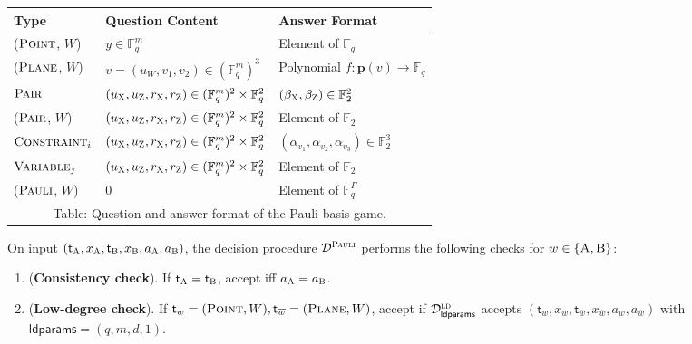 \documentclass[11pt]{article}
\theoremstyle{definition}
\newcommand{\F}{\ensuremath{\mathbb{F}}}
\newcommand{\ld}{\textsc{ld}}
\newcommand{\pl}{\mathbf{p}}
\newcommand{\decider}{\mathcal{D}}
\newcommand{\gamestyle}[1]{\ensuremath{\textsc{#1}}\xspace}
\newcommand{\pauli}{\gamestyle{Pauli}}
\newcommand{\labelstyle}[1]{\ensuremath{\textsc{#1}}\xspace}
\newcommand{\xpt}{\labelstyle{X}}
\newcommand{\zpt}{\labelstyle{Z}}
\newcommand{\tvarstyle}[1]{\mathsf{#1}}
\newcommand{\tvar}{\ensuremath{\tvarstyle{t}}}
\newcommand{\alice}{\labelstyle{A}}
\newcommand{\bob}{\labelstyle{B}}
\newcommand{\typestyle}[1]{\ensuremath{\textsc{#1}}\xspace}
\newcommand{\Plane}{\typestyle{Plane}}
\newcommand{\Point}{\typestyle{Point}}
\newcommand{\Pair}{\typestyle{Pair}}
\newcommand{\Constraint}{\typestyle{Constraint}}
\newcommand{\Variable}{\typestyle{Variable}}
\newcommand{\Pauli}{\typestyle{Pauli}}
\newcommand{\AB}{\{\alice, \bob\}}
\newcommand{\ldparams}{\mathsf{ldparams}}
\newenvironment{gamespec}{
  \begin{mdframed}[style=figstyle]}{
  \end{mdframed}}
\newcommand{\hnote}[1]{}
\begin{document}
\begin{figure}[htbp!]
  \begin{gamespec}
    \vspace{9pt}
    \begin{center}
      \renewcommand\arraystretch{1.3}
      \begin{tabularx}{.92\textwidth}{ l X l }
        \toprule
        Type & Question Content & Answer Format \\
        \midrule
        (\Point, $W$) & $y \in  \F_q^m$ & Element of $\F_q$  \\
        (\Plane, $W$) & $v = (u_W, v_1, v_2) \in (\F_q^m)^3$
        & Polynomial $f: \pl(v) \to \F_q$\\
        \Pair & $(u_\xpt, u_\zpt, r_\xpt, r_\zpt) \in
        (\F_q^m)^2 \times \F_q^2 $ & $(\beta_\xpt,\beta_\zpt) \in \F_2^2$ \\
        (\Pair, $W$) & $(u_\xpt, u_\zpt, r_\xpt, r_\zpt) \in
        (\F_q^m)^2 \times \F_q^2 $ & Element of $\F_2$ \\
        $\Constraint_i$ & $(u_\xpt, u_\zpt, r_\xpt, r_\zpt) \in (\F_q^m)^2
        \times \F_q^2$ &
        $(\alpha_{v_1}, \alpha_{v_2}, \alpha_{v_3}) \in \F_2^3$ \\
        $\Variable_j$ & $(u_\xpt, u_\zpt, r_\xpt, r_\zpt) \in
        (\F_q^m)^2 \times \F_q^2$ & Element of $\F_2$ \\
        (\Pauli, $W$) & $0$ & Element of $\F_q^{\Gamma}$ \\
        \bottomrule \multicolumn{3}{c}{Table: Question and answer format of the
          Pauli basis game.}
      \end{tabularx}
    \end{center}
    \vspace{9pt}

    On input $(\tvar_\alice,x_\alice, \tvar_\bob, x_\bob, a_\alice, a_\bob)$,
    the decision procedure $\decider^\pauli$ performs the following checks for
    $w \in \AB$:
    \begin{enumerate}[itemsep=2pt,parsep=2pt]
    \item (\textbf{Consistency check}).
      \label{item:same-type}
      If $\tvar_\alice = \tvar_\bob$, accept iff $a_\alice = a_\bob$.

    \item (\textbf{Low-degree check}).
      \label{item:low-degree}
      If $\tvar_w = (\Point, W), \tvar_{\overline{w}} = (\Plane, W)$, accept if
      $\decider^\ld_{\ldparams}$ accepts $(\tvar_w, x_w, \tvar_{\overline{w}}, x_{\overline{w}}, a_w,
      a_{\overline{w}})$ 
with $\ldparams = (q,m,d,1)$.


\end{enumerate}
\end{gamespec}
\end{figure}
\end{document}
